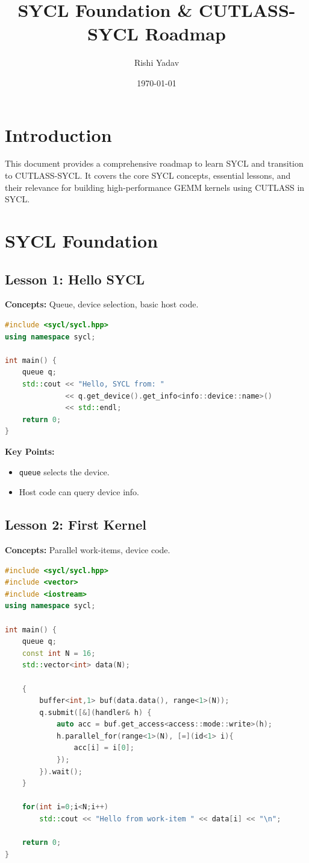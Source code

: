 \documentclass[a4paper,12pt]{article}
\title{SYCL Foundation & CUTLASS-SYCL Roadmap}
\author{Rishi Yadav}
\date{\today}
\begin{document}
\maketitle

\tableofcontents
\newpage

\section{Introduction}
This document provides a comprehensive roadmap to learn SYCL and transition to CUTLASS-SYCL. It covers the core SYCL concepts, essential lessons, and their relevance for building high-performance GEMM kernels using CUTLASS in SYCL.

\section{SYCL Foundation}

\subsection{Lesson 1: Hello SYCL}
\textbf{Concepts:} Queue, device selection, basic host code.

\begin{lstlisting}[language=C++]
#include <sycl/sycl.hpp>
using namespace sycl;

int main() {
    queue q;
    std::cout << "Hello, SYCL from: "
              << q.get_device().get_info<info::device::name>()
              << std::endl;
    return 0;
}
\end{lstlisting}

\textbf{Key Points:}
\begin{itemize}
    \item \texttt{queue} selects the device.
    \item Host code can query device info.
\end{itemize}

\subsection{Lesson 2: First Kernel}
\textbf{Concepts:} Parallel work-items, device code.

\begin{lstlisting}[language=C++]
#include <sycl/sycl.hpp>
#include <vector>
#include <iostream>
using namespace sycl;

int main() {
    queue q;
    const int N = 16;
    std::vector<int> data(N);

    {
        buffer<int,1> buf(data.data(), range<1>(N));
        q.submit([&](handler& h) {
            auto acc = buf.get_access<access::mode::write>(h);
            h.parallel_for(range<1>(N), [=](id<1> i){
                acc[i] = i[0];
            });
        }).wait();
    }

    for(int i=0;i<N;i++)
        std::cout << "Hello from work-item " << data[i] << "\n";

    return 0;
}
\end{lstlisting}
\end{document}
